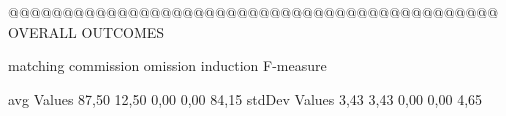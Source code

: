  @@@@@@@@@@@@@@@@@@@@@@@@@@@@@@@@@@@@@@@@@@@@@ OVERALL OUTCOMES

                matching commission   omission  induction   F-measure

avg Values      87,50       12,50       0,00       0,00       84,15        
stdDev Values    3,43       3,43       0,00       0,00        4,65        
